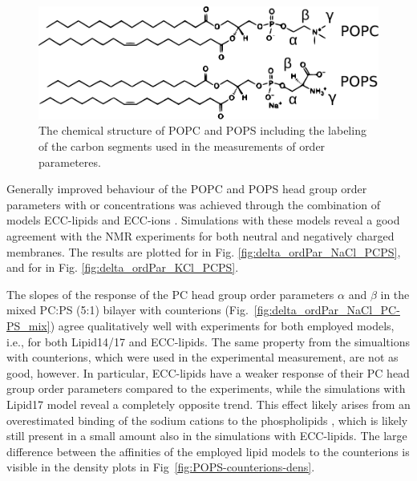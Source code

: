 \documentclass[journal=jpcbfk,manuscript=article]{achemso}
\newlength{\figwidth}
\begin{document}
\begin{figure}[tb!] 
  \centering 
  \includegraphics[width=\figwidth]{../Fig/lipids_chemfig_POPC_POPS.pdf} 
  \caption{ \label{fig:chemstruct_pc_ps} 
            The chemical structure of POPC and POPS 
            including the labeling of the carbon segments
            used in the measurements of order parameteres. 
          }
\end{figure} 





Generally improved behaviour 
of the POPC and POPS head group order parameters 
with  or  concentrations 
was achieved through the combination of models 
ECC-lipids and ECC-ions \citep{martinek17, kohagen16, Pluharova2014}. 
Simulations with these models 
reveal a good agreement with the NMR experiments 
for both neutral and negatively charged membranes.
The results are plotted for  in Fig. \ref{fig:delta_ordPar_NaCl_PCPS}, 
and for  in Fig. \ref{fig:delta_ordPar_KCl_PCPS}. 




The slopes of the response of the PC head group order parameters $\alpha$ and $\beta$ 
in the mixed PC:PS (5:1) bilayer with  counterions
(Fig.~\ref{fig:delta_ordPar_NaCl_PC-PS_mix})
agree qualitatively well with experiments for both employed models,
i.e., for both Lipid14/17 and ECC-lipids. 
The same property from the simualtions with  counterions, 
which were used in the experimental measurement,
are not as good, however.
In particular,
ECC-lipids have a weaker response of their PC head group order parameters compared to the experiments, 
while the simulations with Lipid17 model reveal a completely opposite trend.
This effect likely arises from an overestimated binding of the sodium cations to the phospholipids \cite{nmrlipids_proj4},
which is likely still present in a small amount also in the simulations with ECC-lipids. 
The large difference between the affinities of the employed lipid models to the counterions 
is visible in the density plots in Fig~\ref{fig:POPS-counterions-dens}. 
\end{document}
